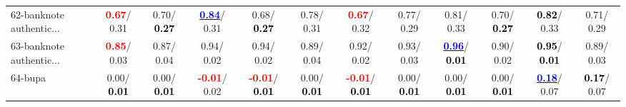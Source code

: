 \begin{table}[h]
\begin{center}
{\begin{tabular}{lc|c|c|c|c|c|c|c|c|c|c}
62-banknote authentic... & \textcolor{red}{\textbf{  0.67}}/  0.31 &   0.70/\textcolor{black}{\textbf{  0.27}} & \underline{\textcolor{blue}{\textbf{  0.84}}}/  0.31 &   0.68/\textcolor{black}{\textbf{  0.27}} &   0.78/  0.31 & \textcolor{red}{\textbf{  0.67}}/  0.32 &   0.77/  0.29 &   0.81/  0.33 &   0.70/\textcolor{black}{\textbf{  0.27}} & \textcolor{black}{\textbf{  0.82}}/  0.33 &   0.71/  0.29 \\
63-banknote authentic... & \textcolor{red}{\textbf{  0.85}}/  0.03 &   0.87/  0.04 &   0.94/  0.02 &   0.94/  0.02 &   0.89/  0.04 &   0.92/  0.02 &   0.93/  0.03 & \underline{\textcolor{blue}{\textbf{  0.96}}}/\textcolor{black}{\textbf{  0.01}} &   0.90/  0.02 & \textcolor{black}{\textbf{  0.95}}/\textcolor{black}{\textbf{  0.01}} &   0.89/  0.03 \\
64-bupa &   0.00/\textcolor{black}{\textbf{  0.01}} &   0.00/\textcolor{black}{\textbf{  0.01}} & \textcolor{red}{\textbf{ -0.01}}/  0.02 & \textcolor{red}{\textbf{ -0.01}}/\textcolor{black}{\textbf{  0.01}} &   0.00/\textcolor{black}{\textbf{  0.01}} & \textcolor{red}{\textbf{ -0.01}}/\textcolor{black}{\textbf{  0.01}} &   0.00/\textcolor{black}{\textbf{  0.01}} &   0.00/\textcolor{black}{\textbf{  0.01}} &   0.00/\textcolor{black}{\textbf{  0.01}} & \underline{\textcolor{blue}{\textbf{  0.18}}}/  0.07 & \textcolor{black}{\textbf{  0.17}}/  0.07 \\\end{tabular}}\label{stratsALCKappa1AllReduxa}
\end{center}
\end{table}
